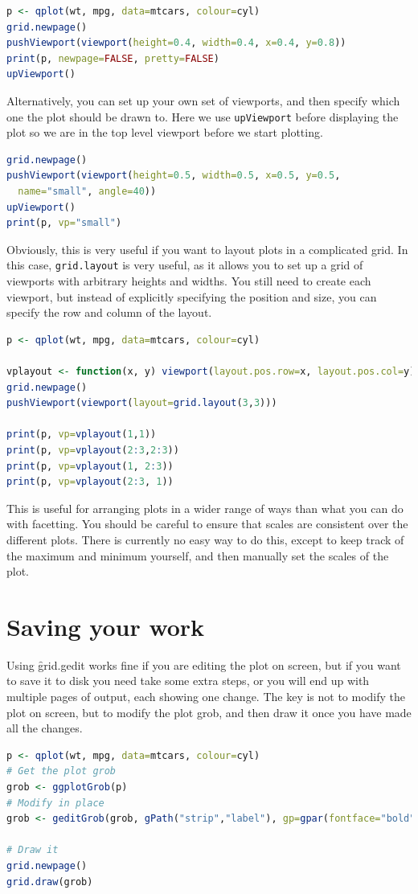 \begin{lstlisting}[language = R]
p <- qplot(wt, mpg, data=mtcars, colour=cyl)
grid.newpage()
pushViewport(viewport(height=0.4, width=0.4, x=0.4, y=0.8))
print(p, newpage=FALSE, pretty=FALSE)
upViewport()
\end{lstlisting}

Alternatively, you can set up your own set of viewports, and then specify which one the plot should be drawn to.  Here we use {\tt upViewport} before displaying the plot so we are in the top level viewport before we start plotting.

\begin{lstlisting}[language = R]
grid.newpage()
pushViewport(viewport(height=0.5, width=0.5, x=0.5, y=0.5, 
  name="small", angle=40))
upViewport()
print(p, vp="small")
\end{lstlisting}

Obviously, this is very useful if you want to layout plots in a complicated grid.  In this case, {\tt grid.layout} is very useful, as it allows you to set up a grid of viewports with arbitrary heights and widths.  You still need to create each viewport, but instead of explicitly specifying the position and size, you can specify the row and column of the layout.

\begin{lstlisting}[language = R]
p <- qplot(wt, mpg, data=mtcars, colour=cyl)

vplayout <- function(x, y) viewport(layout.pos.row=x, layout.pos.col=y)
grid.newpage()
pushViewport(viewport(layout=grid.layout(3,3)))

print(p, vp=vplayout(1,1))
print(p, vp=vplayout(2:3,2:3))
print(p, vp=vplayout(1, 2:3))
print(p, vp=vplayout(2:3, 1))
\end{lstlisting}

This is useful for arranging plots in a wider range of ways than what you can do with facetting.   You should be careful to ensure that scales are consistent over the different plots.  There is currently no easy way to do this, except to keep track of the maximum and minimum yourself, and then manually set the scales of the plot.

\section{Saving your work} 
\label{sec:grid-save}

Using \f{grid.gedit} works fine if you are editing the plot on screen, but if you want to save it to disk you need take some extra steps, or you will end up with multiple pages of output, each showing one change.  The key is not to modify the plot on screen, but to modify the plot grob, and then draw it once you have made all the changes.  

\begin{lstlisting}[language = R]
p <- qplot(wt, mpg, data=mtcars, colour=cyl)
# Get the plot grob
grob <- ggplotGrob(p)
# Modify in place
grob <- geditGrob(grob, gPath("strip","label"), gp=gpar(fontface="bold"))

# Draw it
grid.newpage()
grid.draw(grob)
\end{lstlisting}


